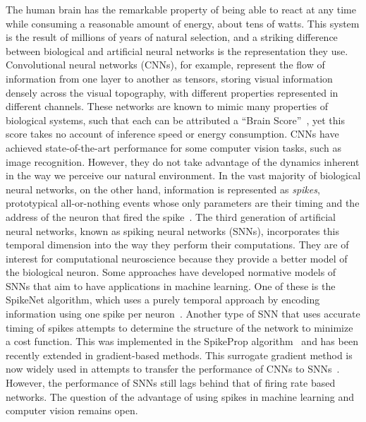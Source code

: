 \documentclass[default]{sn-jnl}%
\theoremstyle{thmstyleone}%
\theoremstyle{thmstyletwo}%
\theoremstyle{thmstylethree}%
\begin{document}
The human brain has the remarkable property of being able to react at any time while consuming a reasonable amount of energy, about tens of watts. This system is the result of millions of years of natural selection, and a striking difference between biological and artificial neural networks is the representation they use. Convolutional neural networks (CNNs), for example, represent the flow of information from one layer to another as tensors, storing visual information densely across the visual topography, with different properties represented in different channels. These networks are known to mimic many properties of biological systems, such that each can be attributed a ``Brain Score''~\citep{schrimpf_brain-score_2020}, yet this score takes no account of inference speed or energy consumption. CNNs have achieved state-of-the-art performance for some computer vision tasks, such as image recognition. However, they do not take advantage of the dynamics inherent in the way we perceive our natural environment. In the vast majority of biological neural networks, on the other hand, information is represented as \emph{spikes}, prototypical all-or-nothing events whose only parameters are their timing and the address of the neuron that fired the spike~\citep{paugam-moisy_computing_2012}. The third generation of artificial neural networks, known as spiking neural networks (SNNs), incorporates this temporal dimension into the way they perform their computations. They are of interest for computational neuroscience because they provide a better model of the biological neuron. Some approaches have developed normative models of SNNs that aim to have applications in machine learning. One of these is the SpikeNet algorithm, which uses a purely temporal approach by encoding information using one spike per neuron~\citep{delorme_spikenet_1999}. Another type of SNN that uses accurate timing of spikes attempts to determine the structure of the network to minimize a cost function. This was implemented in the SpikeProp algorithm~\citep{bohte_error-backpropagation_2002} and has been recently extended in gradient-based methods. This surrogate gradient method is now widely used in attempts to transfer the performance of CNNs to SNNs~\citep{zenke_remarkable_2021}. However, the performance of SNNs still lags behind that of firing rate based networks. The question of the advantage of using spikes in machine learning and computer vision remains open.
\end{document}
